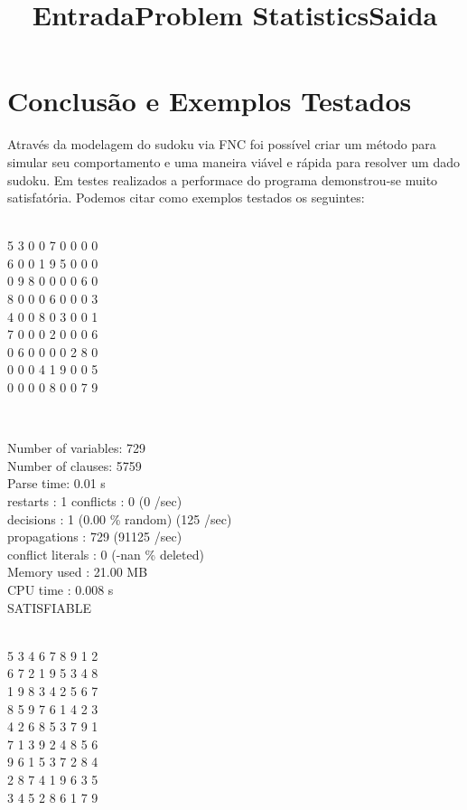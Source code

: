 \documentclass[a4paper]{article}
\begin{document}
\newpage
\section{Conclusão e Exemplos Testados}
Através da modelagem do sudoku via FNC foi possível criar um método para simular seu comportamento e uma maneira viável e rápida para resolver um dado sudoku. Em testes realizados a performace do programa demonstrou-se muito satisfatória. Podemos citar como exemplos testados os seguintes:\\

\begin{center}
\title{\large Entrada}\\
5 3 0 0 7 0 0 0 0 \\
6 0 0 1 9 5 0 0 0 \\
0 9 8 0 0 0 0 6 0 \\
8 0 0 0 6 0 0 0 3 \\
4 0 0 8 0 3 0 0 1 \\
7 0 0 0 2 0 0 0 6 \\
0 6 0 0 0 0 2 8 0 \\
0 0 0 4 1 9 0 0 5 \\
0 0 0 0 8 0 0 7 9 \\
\end{center}
\begin{center}
\title{\large Problem Statistics}\\

\end{center}
Number of variables:           729 \\
Number of clauses:            5759\\
Parse time:                   0.01 s\\
restarts              : 1
conflicts             : 0              (0 /sec)\\
decisions             : 1              (0.00 \% random) (125 /sec)\\
propagations          : 729            (91125 /sec)\\
conflict literals     : 0              (-nan \% deleted)\\
Memory used           : 21.00 MB\\
CPU time              : 0.008 s\\
SATISFIABLE\\


\begin{center}
\title{\large Saida}\\
5  3  4  6  7  8  9  1  2  \\
6  7  2  1  9  5  3  4  8  \\
1  9  8  3  4  2  5  6  7  \\
8  5  9  7  6  1  4  2  3  \\
4  2  6  8  5  3  7  9  1  \\
7  1  3  9  2  4  8  5  6  \\
9  6  1  5  3  7  2  8  4  \\
2  8  7  4  1  9  6  3  5  \\
3  4  5  2  8  6  1  7  9  \\
\end{center}
\end{document}
